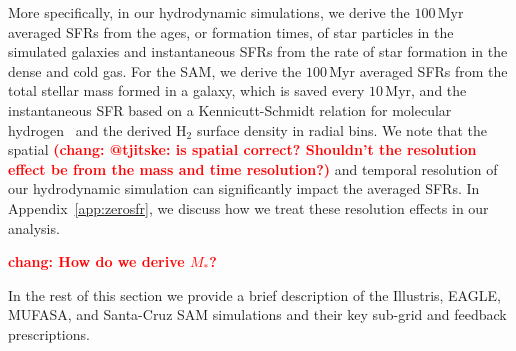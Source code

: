 \documentclass[preprint2,tighten]{aastex62}
\newcommand{\todo}[1]{{\bf \textcolor{red}{ #1}}}
\begin{document}
More specifically, in our hydrodynamic simulations, we derive the 
$100\,\mathrm{Myr}$ averaged SFRs from the ages, or formation times, 
of star particles in the simulated galaxies and instantaneous SFRs 
from the rate of star formation in the dense and cold gas. For the 
SAM, we derive the $100\,\mathrm{Myr}$ averaged SFRs from the total stellar 
mass formed in a galaxy, which is saved every $10\,\mathrm{Myr}$, and 
the instantaneous SFR based on a Kennicutt-Schmidt relation for 
molecular hydrogen~\citep{bigiel2008} and the derived H$_2$ surface 
density in radial bins.
We note that the spatial \todo{(chang: @tjitske: is spatial correct? Shouldn't the resolution effect be from the mass and time resolution?)} and temporal resolution of our hydrodynamic 
simulation can significantly impact the averaged SFRs. In 
Appendix~\ref{app:zerosfr}, we discuss how we treat
these resolution effects in our analysis.

\todo{chang: How do we derive $M_*$?}

In the rest of this section we provide a brief description of the 
Illustris, EAGLE, MUFASA, and Santa-Cruz SAM simulations and their 
key sub-grid and feedback prescriptions. 


\end{document}
